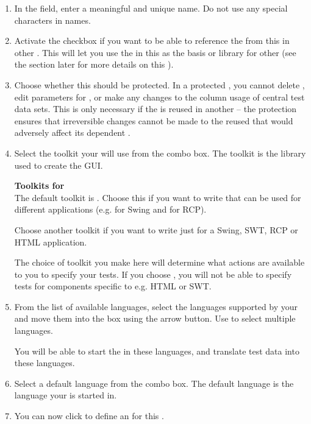 \begin{enumerate}
\item In the  field, enter a meaningful and unique \gdproject{} name.
 Do not use any special characters in \gdproject{} names. 

\item Activate the  checkbox if you want to be able to reference the \gdcases{} from this \gdproject{} in other \gdprojects{}.
This will let you use  the \gdcases{} in this \gdproject{} as the basis or library for other \gdprojects{}  (see the section later for more details on this ). 

\item Choose whether this \gdproject{} should be protected. In a protected \gdprojects{}, you cannot delete \gdcases{},  edit parameters for \gdcases{}, or make any changes to the column usage of central test data sets. This is only necessary if the \gdproject{} is reused in another \gdproject{} -- the protection ensures that irreversible changes cannot be made to the reused \gdproject{} that would adversely affect its dependent \gdprojects{}.

\item Select the toolkit your \gdproject{} will use from the combo box. The toolkit is the library used to create the GUI. 

\textbf{Toolkits for \gdprojects{}}\\
\label{projtoolkit}
The default toolkit is . Choose this if you want to write \gdcases{} that can be used for different applications (e.g. for Swing and for RCP).

Choose another toolkit if you want to write \gdcases{} just for a Swing, SWT, RCP or HTML application. 

The choice of toolkit you make here will determine what actions are available to you to specify your tests. If you choose , you will not be able to specify tests for components specific to e.g. HTML or SWT.

\item From the list of available languages, select the languages supported by your \gdaut{} and move them into the  box using the arrow button. Use  to select multiple languages.

You will be able to start the \gdaut{} in these languages, and translate test data into these languages. 


\item Select a default language from the combo box. The default language is the language your \gdproject{} is started in. 

\item You can now click  to define an \gdaut{} for this \gdproject{} .
\end{enumerate}

